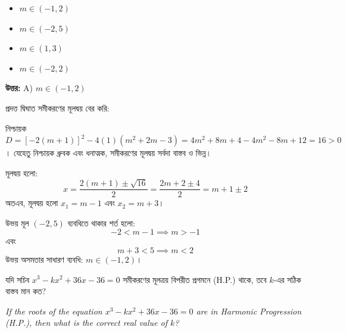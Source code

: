 \documentclass[12pt, a4paper]{article}
\begin{document}
\begin{itemize}[label={}, leftmargin=1cm, itemsep=0.5em]
    \item[\textbf{A)}] $m \in (-1, 2)$
    \item[\textbf{B)}] $m \in (-2, 5)$
    \item[\textbf{C)}] $m \in (1, 3)$
    \item[\textbf{D)}] $m \in (-2, 2)$
\end{itemize}

\vspace{0.5em}
\begin{tcolorbox}[answerbox]
    \textbf{\color{success} উত্তর:} A) $m \in (-1, 2)$
\end{tcolorbox}
\vspace{1em}

\begin{tcolorbox}[solutionbox={সমাধান (Solution)}]
    \noindent
    প্রদত্ত দ্বিঘাত সমীকরণের মূলদ্বয় বের করি:
    
    নিশ্চায়ক $D = [-2(m+1)]^2 - 4(1)(m^2+2m-3) = 4m^2 + 8m + 4 - 4m^2 - 8m + 12 = 16 > 0$। যেহেতু নিশ্চায়ক ধ্রুবক এবং ধনাত্মক, সমীকরণের মূলদ্বয় সর্বদা বাস্তব ও ভিন্ন।
    
    মূলদ্বয় হলো:
    \[ x = \frac{2(m+1) \pm \sqrt{16}}{2} = \frac{2m + 2 \pm 4}{2} = m+1 \pm 2 \]
    অতএব, মূলদ্বয় হলো $x_1 = m-1$ এবং $x_2 = m+3$। 
    
    উভয় মূল $(-2, 5)$ ব্যবধিতে থাকার শর্ত হলো:
    \[ -2 < m-1 \implies m > -1 \]
    এবং 
    \[ m+3 < 5 \implies m < 2 \]
    উভয় অসমতার সাধারণ ব্যবধি: $m \in (-1, 2)$।
\end{tcolorbox}

\vspace{1em}

\begin{tcolorbox}[questionbox={প্রশ্ন (Question) 41}]
    \noindent
    যদি সচিব $x^3 - kx^2 + 36x - 36 = 0$ সমীকরণের মূলত্রয় বিপরীত প্রগমনে (H.P.) থাকে, তবে $k$-এর সঠিক বাস্তব মান কত?
    
    \vspace{0.8em}
    \begin{english}
    \noindent\textit{\color{darkgray}
    If the roots of the equation $x^3 - kx^2 + 36x - 36 = 0$ are in Harmonic Progression (H.P.), then what is the correct real value of $k$?
    }
    \end{english}
\end{tcolorbox}
\end{document}
